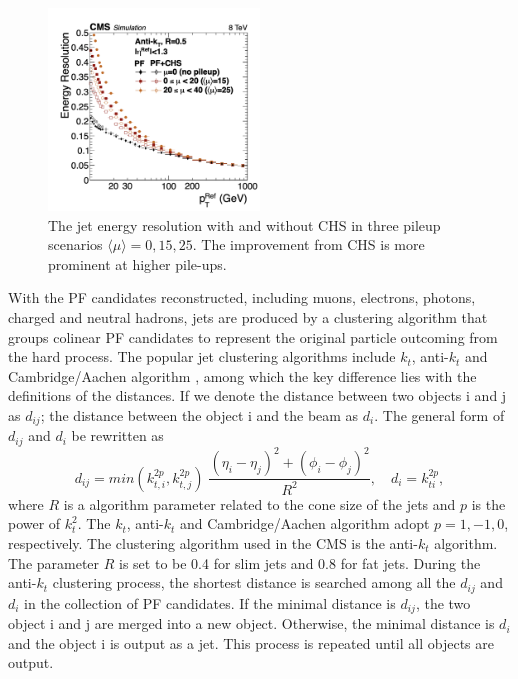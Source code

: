 \begin{figure}[ht]
    \centering
    \includegraphics[width=0.5\textwidth]{chapters/CMSExperiment/sectionReconstruction/figures/jetres_pf_chs}
    \caption{ The jet energy resolution \cite{cms:particleflow:Sirunyan:2017ulk} with and without CHS in three pileup scenarios $\langle \mu\rangle =0,15,25$. The improvement from CHS is more prominent at higher pile-ups.  }
    \label{fig:cmsexperiment:reconstruction:resJet}
\end{figure}



With the PF candidates reconstructed, including muons, electrons, photons, charged and neutral hadrons, jets are produced by a clustering algorithm that groups colinear PF candidates to represent the original particle outcoming from the hard process. The popular jet clustering algorithms include $k_t$, anti-$k_t$ and Cambridge/Aachen algorithm \cite{tech:antikt:Cacciari:2008gp}, among which the key difference lies with the definitions of the distances. If we denote the distance between two objects i and j as $d_{ij}$; the distance between the object i and the beam as $d_i$. The general form of $d_{ij}$ and $d_i$ be rewritten as
\begin{equation}
	d_{ij} = min(k_{t,i}^{2p}, k_{t,j}^{2p}) \; \frac{(\eta_i-\eta_j) ^2 + (\phi_i-\phi_j) ^2}{R^2} , \quad d_i =k_{ti}^{2p},
\end{equation}
\noindent where $R$ is a algorithm parameter related to the cone size of the jets and $p$ is the power of $k_t^2$. The $k_t$, anti-$k_t$ and Cambridge/Aachen algorithm adopt $p=1,-1,0$, respectively. The clustering algorithm used in the CMS is the anti-$k_t$ algorithm. The parameter $R$ is set to be 0.4 for slim jets and 0.8 for fat jets. During the anti-$k_t$ clustering process, the shortest distance is searched among all the $d_{ij}$ and $d_i$ in the collection of PF candidates. If the minimal distance is $d_{ij}$, the two object i and j are merged into a new object. Otherwise, the minimal distance is $d_{i}$ and the object i is output as a jet. This process is repeated until all objects are output. 

